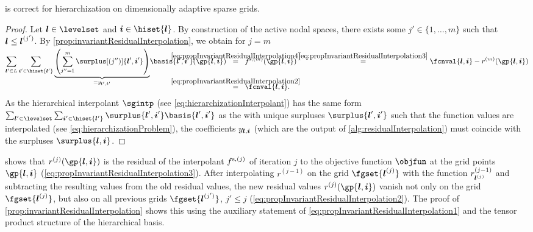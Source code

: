 \begin{corollary}
   is correct for hierarchization
  on dimensionally adaptive sparse grids.
\end{corollary}

\begin{proof}
  Let $\*l \in \levelset$ and $\*i \in \hiset{\*l}$.
  By construction of the active nodal spaces,
  there exists some $j' \in \{1, \dotsc, m\}$ such that ${\boldsymbol{l}} \le {\boldsymbol{l}}^{(j')}$.
  By \cref{prop:invariantResidualInterpolation}, we obtain
  for $j = m$
  \begin{subequations}
    \begin{align}
      \sum_{\*l' \in L} \sum_{\*i' \in \hiset{\*l'}}
      \smash{
        \underbrace{
          \left(\sum_{j''=1}^{m} \surplus[(j'')]{\*l',\*i'}\right)
        }_{= \linout{\*l',\*i'}}
      }
      \basis{\*l',\*i'}(\gp{\*l,\*i})
      &\quad\;
      \mathclap{\overset{\eqref{eq:propInvariantResidualInterpolation4}}{=}}
      \quad\;
      f^{\sparse,(m)}(\gp{\*l,\*i})
      \overset{\eqref{eq:propInvariantResidualInterpolation3}}{=}
      \fcnval{\*l,\*i} - r^{(m)}(\gp{\*l,\*i})\\
      &\quad\;
      \mathclap{\overset{\eqref{eq:propInvariantResidualInterpolation2}}{=}}
      \quad\;
      \fcnval{\*l,\*i}.
    \end{align}
  \end{subequations}
  As the hierarchical interpolant $\sgintp$
  (see \eqref{eq:hierarchizationInterpolant})
  has the same form
  $\sum_{\*l' \in \levelset} \sum_{\*i' \in \hiset{\*l'}}
  \surplus{\*l',\*i'} \basis{\*l',\*i'}$ as the \lhs
  with unique surpluses $\surplus{\*l',\*i'}$ such that the function values
  are interpolated (see \eqref{eq:hierarchizationProblem}),
  the coefficients $\linout{\*l,\*i}$
  (which are the output of \cref{alg:residualInterpolation})
  must coincide with the surpluses $\surplus{\*l,\*i}$.
\end{proof}

 shows that
$r^{(j)}(\gp{\*l,\*i})$ is the residual of the
interpolant $f^{\mathrm{s},(j)}$ of iteration $j$
to the objective function $\objfun$ at the grid points $\gp{\*l,\*i}$
(\cref{eq:propInvariantResidualInterpolation3}).
After interpolating $r^{(j-1)}$ on the grid $\fgset{\*l^{(j)}}$
with the function $r_{{\boldsymbol{l}}^{(j)}}^{(j-1)}$
and subtracting the resulting values from the old residual values,
the new residual values $r^{(j)}(\gp{\*l,\*i})$ vanish
not only on the grid $\fgset{\*l^{(j)}}$,
but also on all previous grids $\fgset{\*l^{(j')}}$, $j' \le j$
(\cref{eq:propInvariantResidualInterpolation2}).
The proof of \cref{prop:invariantResidualInterpolation}
shows this using the auxiliary statement of
\cref{eq:propInvariantResidualInterpolation1}
and the tensor product structure of the hierarchical basis.

